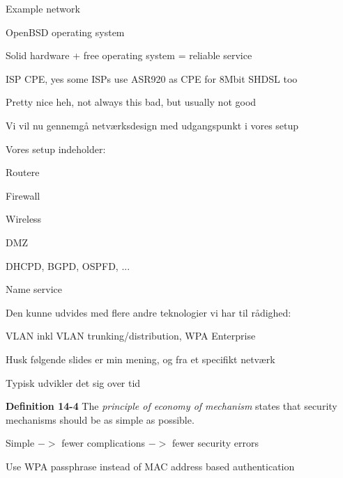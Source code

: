\documentclass[Screen16to9,17pt]{foils}
\begin{document}

Example network

\begin{list2}
\item OpenBSD operating system
\item Solid hardware + free operating system = reliable service
\item ISP CPE, yes some ISPs use ASR920 as CPE for 8Mbit SHDSL too\smiley
\end{list2}




\centerline{Pretty nice heh, not always this bad, but usually not good}


\begin{list1}
\item Vi vil nu gennemgå netværksdesign med udgangspunkt i vores setup
\item Vores setup indeholder:
\begin{list2}
\item Routere
\item Firewall
\item Wireless
\item DMZ
\item DHCPD, BGPD, OSPFD, ...
\item Name service
\end{list2}
\item Den kunne udvides med flere andre teknologier vi har til rådighed:
\begin{list2}
\item VLAN inkl VLAN trunking/distribution, WPA Enterprise
\end{list2}
\item Husk følgende slides er min mening, og fra et specifikt netværk
\item Typisk udvikler det sig over tid
\end{list1}



\begin{list1}
\item {\bf Definition 14-4} The \emph{principle of economy of mechanism} states that security mechanisms should be as simple as possible.
\item Simple $->$ fewer complications $->$ fewer security errors
\item Use WPA passphrase instead of MAC address based authentication
\item
\end{list1}
\end{document}
